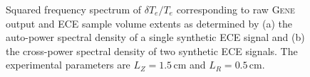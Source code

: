 \documentclass[%
 aip,
 amsmath,amssymb,
 reprint,%
]{revtex4-1}
\newcommand{\gene}[1]{\rmfamily\textsc{Gene}#1}
\begin{document}
\begin{figure}[!htpb]
\centering
\begin{subfigure}[]{.49\textwidth}
  \centering
\end{subfigure}
\hfill
\begin{subfigure}[]{.49\textwidth}
  \centering
\end{subfigure}
\hfill

\caption{Squared frequency spectrum of $\delta T_e/T_e$  corresponding to raw \gene{} output and ECE sample volume extents as determined by (a) the auto-power spectral density of a single synthetic ECE signal and (b) the cross-power spectral density of two synthetic ECE signals. The experimental parameters are $L_Z=1.5$\,cm and $L_R=0.5$\,cm.}
\label{fig:synth_sigs_unfilt_filt_spec}
\end{figure}
\end{document}
